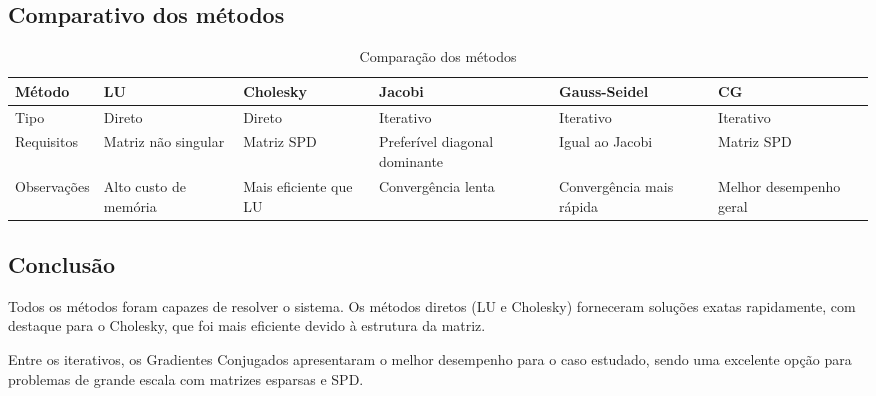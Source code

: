 \documentclass{article} %
\theoremstyle{definition}
\begin{document}
        \subsection*{Comparativo dos métodos}
                \begin{table}[h!]
                \centering
                \caption{Comparação dos métodos}
                \renewcommand{\arraystretch}{1.3} %
                \begin{tabularx}{\textwidth}{@{}lXXXXX@{}} %
                \toprule
                Método         & LU      & Cholesky & Jacobi    & Gauss-Seidel & CG \\
                \midrule
                Tipo           & Direto  & Direto   & Iterativo & Iterativo    & Iterativo \\
                Requisitos     & Matriz não singular 
                               & Matriz SPD 
                               & Preferível diagonal dominante 
                               & Igual ao Jacobi 
                               & Matriz SPD \\
                Observações    & Alto custo de memória 
                               & Mais eficiente que LU 
                               & Convergência lenta 
                               & Convergência mais rápida 
                               & Melhor desempenho geral \\
                \bottomrule
                \end{tabularx}
                \end{table}
        \subsection*{Conclusão}

            Todos os métodos foram capazes de resolver o sistema. 
            Os métodos diretos (LU e Cholesky) forneceram soluções exatas rapidamente,
            com destaque para o Cholesky, que foi mais eficiente devido à estrutura da matriz.

            Entre os iterativos, os Gradientes Conjugados apresentaram o melhor desempenho para
            o caso estudado, sendo uma excelente opção para problemas de grande escala com
            matrizes esparsas e SPD.
            
\end{document}
